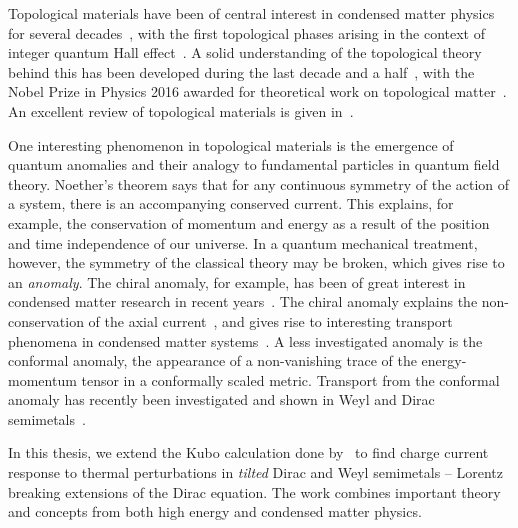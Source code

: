 %
Topological materials have been of central interest in condensed matter physics for several decades~\cite{fruchartIntroductionTopologicalInsulators2013}, with the first topological phases arising in the context of integer quantum Hall effect~\cites{klitzingNewMethodHighAccuracy1980}[as cited in][]{fruchartIntroductionTopologicalInsulators2013}.
A solid understanding of the topological theory behind this has been developed during the last decade and a half~\cite{fruchartIntroductionTopologicalInsulators2013, bernevigTopologicalInsulatorsTopological2013}, with the Nobel Prize in Physics 2016 awarded for theoretical work on topological matter~\cite{royalswedishacademyofsciencesNobelPrizePhysics}.
An excellent review of topological materials is given in~\cite{fruchartIntroductionTopologicalInsulators2013}.

One interesting phenomenon in topological materials is the emergence of quantum anomalies and their analogy to fundamental particles in quantum field theory.
Noether's theorem says that for any continuous symmetry of the action of a system, there is an accompanying conserved current.
This explains, for example, the conservation of momentum and energy as a result of the position and time independence of our universe.
In a quantum mechanical treatment, however, the symmetry of the classical theory may be broken, which gives rise to an \emph{anomaly}.
The chiral anomaly, for example, has been of great interest in condensed matter research in recent years~\cite{arjonaFingerprintsConformalAnomaly2019}.
The chiral anomaly explains the non-conservation of the axial current~\cite{zeeQuantumFieldTheory2010}, and gives rise to interesting transport phenomena in condensed matter systems~\cite{burkovChiralAnomalyTransport2015, wehlingDiracMaterials2014, burkovTopologicalSemimetals2016}.
A less investigated anomaly is the conformal anomaly, the appearance of a non-vanishing trace of the energy-momentum tensor in a conformally scaled metric.
Transport from the conformal anomaly has recently been investigated and shown in Weyl and Dirac semimetals~\cite{chernodubAnomalousTransportDue2016, chernodubGenerationNernstCurrent2018, arjonaFingerprintsConformalAnomaly2019}.

In this thesis, we extend the Kubo calculation done by~\textcite{arjonaFingerprintsConformalAnomaly2019} to find charge current response to thermal perturbations in \emph{tilted} Dirac and Weyl semimetals -- Lorentz breaking extensions of the Dirac equation.
The work combines important theory and concepts from both high energy and condensed matter physics.

